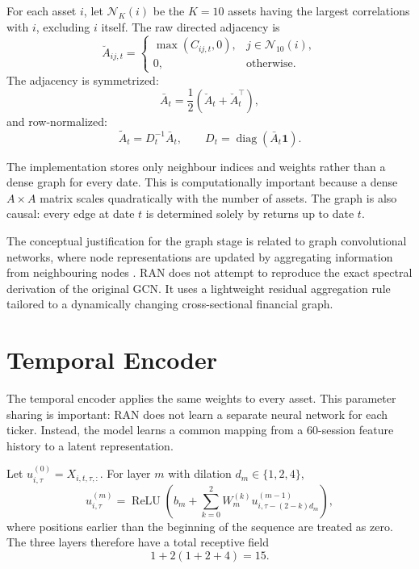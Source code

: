 \documentclass[10pt]{article}
\begin{document}
For each asset $i$, let $\mathcal{N}_K(i)$ be the $K=10$ assets having the largest correlations with $i$, excluding $i$ itself. The raw directed adjacency is
\begin{equation}
\breve A_{ij,t}
=
\begin{cases}
\max(C_{ij,t},0), & j\in\mathcal{N}_{10}(i),\\
0, & \text{otherwise}.
\end{cases}
\end{equation}
The adjacency is symmetrized:
\begin{equation}
\bar A_t
=
\frac{1}{2}
(\breve A_t+\breve A_t^\top),
\end{equation}
and row-normalized:
\begin{equation}
\tilde A_t
=
D_t^{-1}\bar A_t,
\qquad
D_t=\operatorname{diag}(\bar A_t\mathbf 1).
\end{equation}

The implementation stores only neighbour indices and weights rather than a dense graph for every date. This is computationally important because a dense $A\times A$ matrix scales quadratically with the number of assets. The graph is also causal: every edge at date $t$ is determined solely by returns up to date $t$.

The conceptual justification for the graph stage is related to graph convolutional networks, where node representations are updated by aggregating information from neighbouring nodes \citep{kipf2017}. RAN does not attempt to reproduce the exact spectral derivation of the original GCN. It uses a lightweight residual aggregation rule tailored to a dynamically changing cross-sectional financial graph.

\section{Temporal Encoder}

The temporal encoder applies the same weights to every asset. This parameter sharing is important: RAN does not learn a separate neural network for each ticker. Instead, the model learns a common mapping from a 60-session feature history to a latent representation.

Let $u^{(0)}_{i,\tau}=X_{i,t,\tau,:}$. For layer $m$ with dilation $d_m\in\{1,2,4\}$,
\begin{equation}
u^{(m)}_{i,\tau}
=
\operatorname{ReLU}
\left(
b_m+
\sum_{k=0}^{2}
W_m^{(k)}
u^{(m-1)}_{i,\tau-(2-k)d_m}
\right),
\end{equation}
where positions earlier than the beginning of the sequence are treated as zero. The three layers therefore have a total receptive field
\begin{equation}
1+2(1+2+4)=15.
\end{equation}
\end{document}
